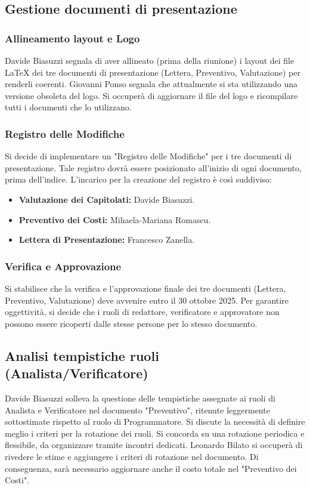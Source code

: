 \documentclass[a4paper, 11pt, oneside]{scrartcl} %
\begin{document}
\subsection{Gestione documenti di presentazione}
\subsubsection{Allineamento layout e Logo}
Davide Biasuzzi segnala di aver allineato (prima della riunione) i layout dei file LaTeX dei tre documenti di presentazione (Lettera, Preventivo, Valutazione) per renderli coerenti.
Giovanni Ponso segnala che attualmente si sta utilizzando una versione obsoleta del logo. Si occuperà di aggiornare il file del logo e ricompilare tutti i documenti che lo utilizzano.

\subsubsection{Registro delle Modifiche}
Si decide di implementare un "Registro delle Modifiche" per i tre documenti di presentazione. Tale registro dovrà essere posizionato all'inizio di ogni documento, prima dell'indice.
L'incarico per la creazione del registro è così suddiviso:
\begin{itemize}
    \item \textbf{Valutazione dei Capitolati:} Davide Biasuzzi.
    \item \textbf{Preventivo dei Costi:} Mihaela-Mariana Romascu.
    \item \textbf{Lettera di Presentazione:} Francesco Zanella.
\end{itemize}

\subsubsection{Verifica e Approvazione}
Si stabilisce che la verifica e l'approvazione finale dei tre documenti (Lettera, Preventivo, Valutazione) deve avvenire entro il 30 ottobre 2025.
Per garantire oggettività, si decide che i ruoli di redattore, verificatore e approvatore non possono essere ricoperti dalle stesse persone per lo stesso documento.

\subsection{Analisi tempistiche ruoli (Analista/Verificatore)}
Davide Biasuzzi solleva la questione delle tempistiche assegnate ai ruoli di Analista e Verificatore nel documento "Preventivo", ritenute leggermente sottostimate rispetto al ruolo di Programmatore.
Si discute la necessità di definire meglio i criteri per la rotazione dei ruoli. Si concorda su una rotazione periodica e flessibile, da organizzare tramite incontri dedicati.
Leonardo Bilato si occuperà di rivedere le stime e aggiungere i criteri di rotazione nel documento.
Di conseguenza, sarà necessario aggiornare anche il costo totale nel "Preventivo dei Costi".
\end{document}
